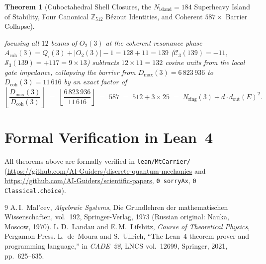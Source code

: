 \documentclass[11pt,a4paper]{article}
\theoremstyle{plain}
\newtheorem{theorem}{Theorem}[section]
\theoremstyle{definition}
\begin{document}
\begin{theorem}[Cuboctahedral Shell Closures, the $N_{\mathrm{island}}=184$ Superheavy Island of Stability, Four Canonical $\mathbb{Z}_{512}$ B\'ezout Identities, and Coherent $587\times$ Barrier Collapse]
\begin{enumerate}[label=\textbf{(\roman*)},leftmargin=*]
  focusing all $12$ beams of $O_2(3)$ at the coherent resonance phase $A_{\mathrm{coh}}(3) = Q_\square(3) + |O_2(3)| - 1 = 128 + 11 = 139$ ($\mathcal{C}_3(139) = -11$, $\mathcal{S}_3(139) = +117 = 9\times 13$) subtracts $12\times 11 = 132$ cosine units from the local gate impedance, collapsing the barrier from $D_{\max}(3) = 6\,823\,936$ to $D_{\mathrm{coh}}(3) = 11\,616$ by an exact factor of
  \begin{equation}
    \label{eq:collapse-587}
    \left\lfloor \frac{D_{\max}(3)}{D_{\mathrm{coh}}(3)}\right\rfloor \;=\; \left\lfloor \frac{6\,823\,936}{11\,616}\right\rfloor \;=\; 587 \;=\; 512 + 3\times 25 \;=\; N_{\mathrm{ring}}(3) + d\cdot d_{\mathrm{out}}(E)^2.
  \end{equation}
\end{enumerate}
\end{theorem}

\section{Formal Verification in Lean~4}
All theorems above are formally verified in \texttt{lean/MtCarrier/} (\url{https://github.com/AI-Guiders/discrete-quantum-mechanics} and \url{https://github.com/AI-Guiders/scientific-papers}, \texttt{0 sorryAx}, \texttt{0 Classical.choice}).

\begin{thebibliography}{9}
A.\,I.~Mal'cev, \emph{Algebraic Systems}, Die Grundlehren der mathematischen Wissenschaften, vol.~192, Springer-Verlag, 1973 (Russian original: Nauka, Moscow, 1970).
L.\,D.~Landau and E.\,M.~Lifshitz, \emph{Course of Theoretical Physics}, Pergamon Press.
L.~de~Moura and S.~Ullrich, ``The Lean~4 theorem prover and programming language,'' in \emph{CADE~28}, LNCS vol.~12699, Springer, 2021, pp.~625--635.
\end{thebibliography}
\end{document}
